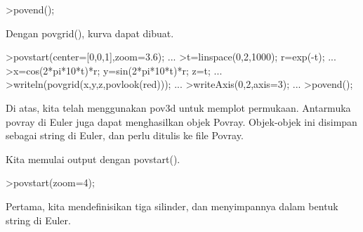 \documentclass[a4paper,10pt]{article}
\begin{document}
\begin{eulernotebook}
\begin{eulercomment}
\begin{eulercomment}
\begin{eulercomment}
\begin{eulercomment}
\begin{eulercomment}
\begin{eulercomment}
\begin{eulercomment}
\begin{eulercomment}
\begin{eulercomment}
\begin{eulercomment}
\begin{eulerprompt}
>povend();
\end{eulerprompt}
\begin{eulercomment}
Dengan povgrid(), kurva dapat dibuat.
\end{eulercomment}
\begin{eulerprompt}
>povstart(center=[0,0,1],zoom=3.6); ...
>t=linspace(0,2,1000); r=exp(-t); ...
>x=cos(2*pi*10*t)*r; y=sin(2*pi*10*t)*r; z=t; ...
>writeln(povgrid(x,y,z,povlook(red))); ...
>writeAxis(0,2,axis=3); ...
>povend();
\end{eulerprompt}
\begin{eulercomment}
Di atas, kita telah menggunakan pov3d untuk memplot permukaan.
Antarmuka povray di Euler juga dapat menghasilkan objek Povray.
Objek-objek ini disimpan sebagai string di Euler, dan perlu ditulis ke
file Povray.

Kita memulai output dengan povstart().
\end{eulercomment}
\begin{eulerprompt}
>povstart(zoom=4);
\end{eulerprompt}
\begin{eulercomment}
Pertama, kita mendefinisikan tiga silinder, dan menyimpannya dalam
bentuk string di Euler.


\end{eulercomment}
\end{eulercomment}
\end{eulercomment}
\end{eulercomment}
\end{eulercomment}
\end{eulercomment}
\end{eulercomment}
\end{eulercomment}
\end{eulercomment}
\end{eulercomment}
\end{eulercomment}
\end{eulernotebook}
\end{document}
